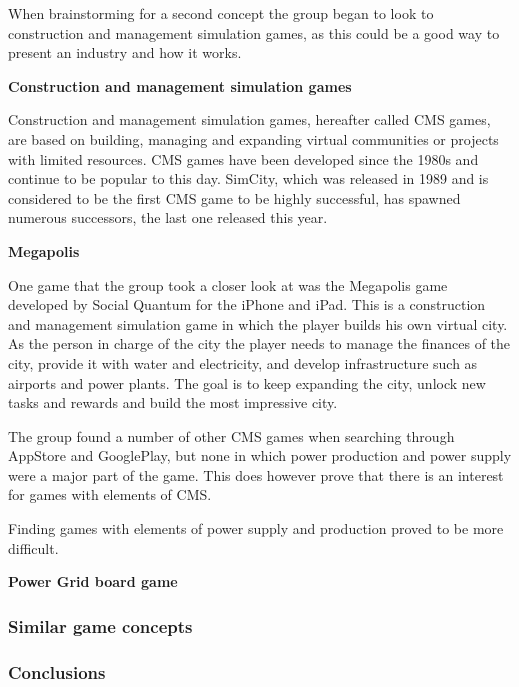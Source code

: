 When brainstorming for a second concept the group began to look to construction and management simulation games, as this could be a good way to present an industry and how it works.
\newline

{\bf Construction and management simulation games}
\newline

Construction and management simulation games, hereafter called CMS games, are based on building, managing and expanding virtual communities or projects with limited resources. CMS games have been developed since the 1980s and continue to be popular to this day. SimCity, which was released in 1989 and is considered to be the first CMS game to be highly successful, has spawned numerous successors, the last one released this year.
\newline

{\bf Megapolis}
\newline

One game that the group took a closer look at was the Megapolis game developed by Social Quantum for the iPhone and iPad. This is a construction and management simulation game in which the player builds his own virtual city. As the person in charge of the city the player needs to manage the finances of the city, provide it with water and electricity, and develop infrastructure such as airports and power plants. The goal is to keep expanding the city, unlock new tasks and rewards and build the most impressive city.
\newline

The group found a number of other CMS games when searching through AppStore and GooglePlay, but none in which power production and power supply were a major part of the game. This does however prove that there is an interest for games with elements of CMS. 
\newline

Finding games with elements of power supply and production proved to be more difficult. 
\newline

{\bf Power Grid board game}


\subsubsection{Similar game concepts}


\subsubsection{Conclusions}
